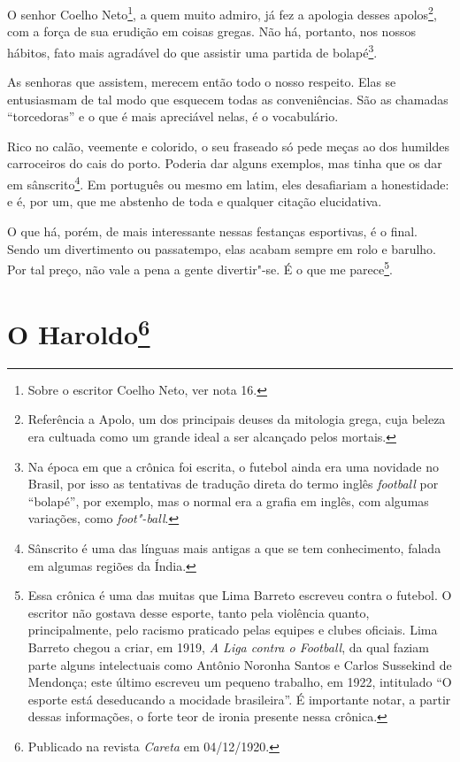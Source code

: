 O senhor Coelho Neto\footnote{Sobre o escritor Coelho Neto, ver nota 16.},
a quem muito admiro, já fez a apologia desses apolos\footnote{Referência
  a Apolo, um dos principais deuses da mitologia grega, cuja beleza era
  cultuada como um grande ideal a ser alcançado pelos mortais.}, com a
força de sua erudição em coisas gregas. Não há, portanto, nos nossos
hábitos, fato mais agradável do que assistir uma partida de
bolapé\footnote{Na época em que a crônica foi escrita, o futebol ainda
  era uma novidade no Brasil, por isso as tentativas de tradução direta
  do termo inglês \emph{football} por ``bolapé'', por exemplo, mas o
  normal era a grafia em inglês, com algumas variações, como
  \emph{foot"-ball}.}.

As senhoras que assistem, merecem então todo o nosso respeito. Elas se
entusiasmam de tal modo que esquecem todas as conveniências. São as
chamadas ``torcedoras'' e o que é mais apreciável nelas, é o
vocabulário.

Rico no calão, veemente e colorido, o seu fraseado só pede meças ao dos
humildes carroceiros do cais do porto. Poderia dar alguns exemplos, mas
tinha que os dar em sânscrito\footnote{Sânscrito é uma das línguas mais
  antigas a que se tem conhecimento, falada em algumas regiões da Índia.}.
Em português ou mesmo em latim, eles desafiariam a honestidade: e é, por
um, que me abstenho de toda e qualquer citação elucidativa.

O que há, porém, de mais interessante nessas festanças esportivas, é o
final. Sendo um divertimento ou passatempo, elas acabam sempre em rolo e
barulho. Por tal preço, não vale a pena a gente divertir"-se. É o que me
parece\footnote{Essa crônica é uma das muitas que Lima Barreto escreveu
  contra o futebol. O escritor não gostava desse esporte, tanto pela
  violência quanto, principalmente, pelo racismo praticado pelas equipes
  e clubes oficiais. Lima Barreto chegou a criar, em 1919, \emph{A Liga
  contra o Football}, da qual faziam parte alguns intelectuais como
  Antônio Noronha Santos e Carlos Sussekind de Mendonça; este último
  escreveu um pequeno trabalho, em 1922, intitulado ``O esporte está
  deseducando a mocidade brasileira''. É importante notar, a partir
  dessas informações, o forte teor de ironia presente nessa crônica.}.



\chapter[O Haroldo]{O Haroldo\footnote[*]{Publicado na revista \emph{Careta} em 04/12/1920.}}

